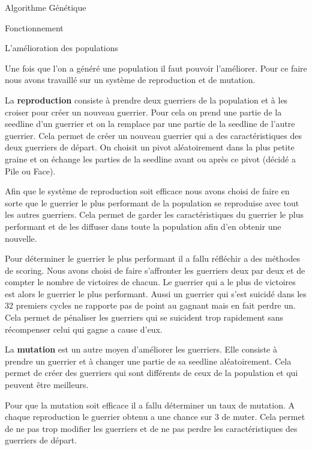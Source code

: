 \documentclass[a4paper, 10pt]{article}
\begin{document}
\begin{section}{Algorithme Génétique}
\begin{subsection}{Fonctionnement}
            \begin{subsubsection}{L'amélioration des populations}
                \par
                    Une fois que l'on a généré une population il faut pouvoir l'améliorer. Pour ce faire nous avons travaillé sur un système de reproduction et de mutation.
                    \medskip
                \par
                    La \textbf{reproduction} consiste à prendre deux guerriers de la population et à les croiser pour créer un nouveau guerrier. Pour cela on prend une partie de la seedline d'un guerrier et on la remplace par une partie de la seedline de l'autre guerrier. Cela permet de créer un nouveau guerrier qui a des caractéristiques des deux guerriers de départ. On choisit un pivot aléatoirement dans la plus petite graine et on échange les parties de la seedline avant ou après ce pivot (décidé a Pile ou Face).
                    \medskip
                \par
                    Afin que le système de reproduction soit efficace nous avons choisi de faire en sorte que le guerrier le plus performant de la population se reproduise avec tout les autres guerriers. Cela permet de garder les caractéristiques du guerrier le plus performant et de les diffuser dans toute la population afin d'en obtenir une nouvelle.
                    \medskip
                \par
                    Pour déterminer le guerrier le plus performant il a fallu réfléchir a des méthodes de scoring. Nous avons choisi de faire s'affronter les guerriers deux par deux et de compter le nombre de victoires de chacun. Le guerrier qui a le plus de victoires est alors le guerrier le plus performant. Aussi un guerrier qui s'est suicidé dans les 32 premiers cycles ne rapporte pas de point au gagnant mais en fait perdre un. Cela permet de pénaliser les guerriers qui se suicident trop rapidement sans récompenser celui qui gagne a cause d'eux. 
                    \medskip
                \par
                    La \textbf{mutation} est un autre moyen d'améliorer les guerriers. Elle consiste à prendre un guerrier et à changer une partie de sa seedline aléatoirement. Cela permet de créer des guerriers qui sont différents de ceux de la population et qui peuvent être meilleurs.
                    \medskip
                \par
                    Pour que la mutation soit efficace il a fallu déterminer un taux de mutation. A chaque reproduction le guerrier obtenu a une chance sur 3 de muter. Cela permet de ne pas trop modifier les guerriers et de ne pas perdre les caractéristiques des guerriers de départ.

\end{subsubsection}
\end{subsection}
\end{section}
\end{document}
